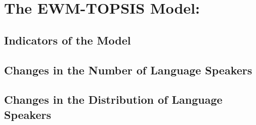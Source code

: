 \MinParskip{}

\section{The EWM-TOPSIS Model: }

\subsection{Indicators of the Model}

\subsection{Changes in the Number of Language Speakers}

\subsection{Changes in the Distribution of Language Speakers}



